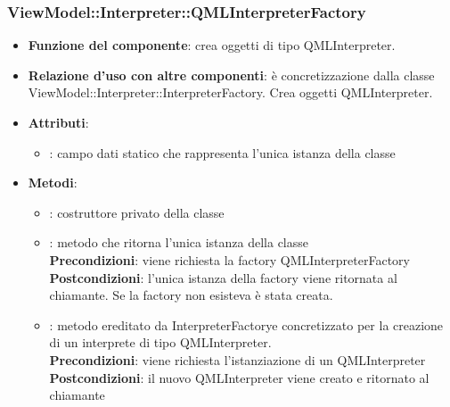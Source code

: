 \subsubsection{ViewModel::Interpreter::QMLInterpreterFactory}
\begin{itemize}
\item\textbf{Funzione del componente}: crea oggetti di tipo QMLInterpreter.
	\item\textbf{Relazione d'uso con altre componenti}: è concretizzazione dalla classe ViewModel::Interpreter::InterpreterFactory. Crea oggetti QMLInterpreter.\\
\item\textbf{Attributi}:
	\begin{itemize}
		\item{}: campo dati statico che rappresenta l'unica istanza della classe\\
	\end{itemize}
\item\textbf{Metodi}:
	\begin{itemize}
		\item{}: costruttore privato della classe\\
		\item{}: metodo che ritorna l'unica istanza della classe\\
		\textbf{Precondizioni}: viene richiesta la factory QMLInterpreterFactory\\
		\textbf{Postcondizioni}: l'unica istanza della factory viene ritornata al chiamante. Se la factory non esisteva è stata creata.\\
		\item{}: metodo ereditato da InterpreterFactorye concretizzato per la creazione di un interprete di tipo QMLInterpreter.\\
		\textbf{Precondizioni}: viene richiesta l'istanziazione di un QMLInterpreter\\
		\textbf{Postcondizioni}: il nuovo QMLInterpreter viene creato e ritornato al chiamante\\
	\end{itemize}
\end{itemize}

